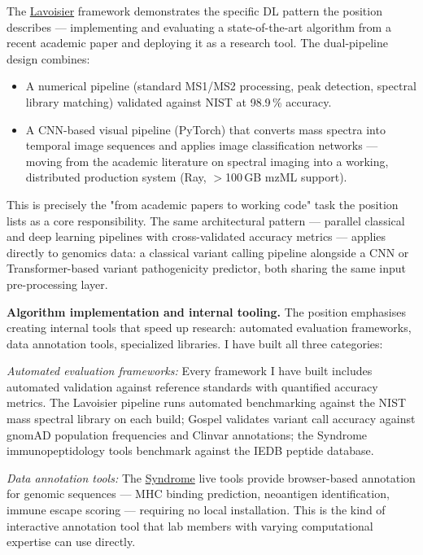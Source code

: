 \documentclass[12pt,a4paper]{article}
\begin{document}
The \href{https://github.com/fullscreen-triangle/lavoisier}{Lavoisier} framework
demonstrates the specific DL pattern the position describes --- implementing and
evaluating a state-of-the-art algorithm from a recent academic paper and deploying
it as a research tool. The dual-pipeline design combines:
\begin{itemize}
  \item A numerical pipeline (standard MS1/MS2 processing, peak detection,
    spectral library matching) validated against NIST at 98.9\,\% accuracy.
  \item A CNN-based visual pipeline (PyTorch) that converts mass spectra
    into temporal image sequences and applies image classification
    networks --- moving from the academic literature on spectral imaging
    into a working, distributed production system (Ray, $>$100\,GB mzML support).
\end{itemize}
This is precisely the "from academic papers to working code" task the position
lists as a core responsibility. The same architectural pattern --- parallel
classical and deep learning pipelines with cross-validated accuracy metrics ---
applies directly to genomics data: a classical variant calling pipeline alongside
a CNN or Transformer-based variant pathogenicity predictor, both sharing the
same input pre-processing layer.

\textbf{Algorithm implementation and internal tooling.}
The position emphasises creating internal tools that speed up research:
automated evaluation frameworks, data annotation tools, specialized libraries.
I have built all three categories:

\textit{Automated evaluation frameworks:} Every framework I have built includes
automated validation against reference standards with quantified accuracy metrics.
The Lavoisier pipeline runs automated benchmarking against the NIST mass spectral
library on each build; Gospel validates variant call accuracy against gnomAD
population frequencies and Clinvar annotations; the Syndrome immunopeptidology
tools benchmark against the IEDB peptide database.

\textit{Data annotation tools:} The
\href{https://syndrome-seven.vercel.app/tools}{Syndrome} live tools provide
browser-based annotation for genomic sequences --- MHC binding prediction,
neoantigen identification, immune escape scoring --- requiring no local
installation. This is the kind of interactive annotation tool that lab members
with varying computational expertise can use directly.
\end{document}
